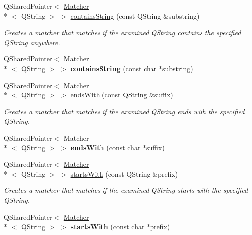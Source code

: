 \begin{DoxyCompactItemize}
\item 
Q\-Shared\-Pointer$<$ \hyperlink{class_hamcrest_qt_1_1_matcher}{Matcher}\\*
$<$ Q\-String $>$ $>$ \hyperlink{namespace_hamcrest_qt_ab456663a918a874b9fbf4c42dde6a439}{contains\-String} (const Q\-String \&substring)
\begin{DoxyCompactList}\small\item\em Creates a matcher that matches if the examined {\ttfamily Q\-String} contains the specified {\ttfamily Q\-String} anywhere. \end{DoxyCompactList}\item 
\hypertarget{namespace_hamcrest_qt_a4c961b244474f08f32c3c6523241c158}{Q\-Shared\-Pointer$<$ \hyperlink{class_hamcrest_qt_1_1_matcher}{Matcher}\\*
$<$ Q\-String $>$ $>$ {\bfseries contains\-String} (const char $\ast$substring)}\label{namespace_hamcrest_qt_a4c961b244474f08f32c3c6523241c158}

\item 
Q\-Shared\-Pointer$<$ \hyperlink{class_hamcrest_qt_1_1_matcher}{Matcher}\\*
$<$ Q\-String $>$ $>$ \hyperlink{namespace_hamcrest_qt_ae6827e66bbc17e98ac7bfc8bc256a399}{ends\-With} (const Q\-String \&suffix)
\begin{DoxyCompactList}\small\item\em Creates a matcher that matches if the examined {\ttfamily Q\-String} ends with the specified {\ttfamily Q\-String}. \end{DoxyCompactList}\item 
\hypertarget{namespace_hamcrest_qt_a43903b6fc354f9d0ff065192278bb62e}{Q\-Shared\-Pointer$<$ \hyperlink{class_hamcrest_qt_1_1_matcher}{Matcher}\\*
$<$ Q\-String $>$ $>$ {\bfseries ends\-With} (const char $\ast$suffix)}\label{namespace_hamcrest_qt_a43903b6fc354f9d0ff065192278bb62e}

\item 
Q\-Shared\-Pointer$<$ \hyperlink{class_hamcrest_qt_1_1_matcher}{Matcher}\\*
$<$ Q\-String $>$ $>$ \hyperlink{namespace_hamcrest_qt_a64e4b2a75d225fcd62ada49698f8614a}{starts\-With} (const Q\-String \&prefix)
\begin{DoxyCompactList}\small\item\em Creates a matcher that matches if the examined {\ttfamily Q\-String} starts with the specified {\ttfamily Q\-String}. \end{DoxyCompactList}\item 
\hypertarget{namespace_hamcrest_qt_a8631f62f98d1de7d44558107f0daf1f6}{Q\-Shared\-Pointer$<$ \hyperlink{class_hamcrest_qt_1_1_matcher}{Matcher}\\*
$<$ Q\-String $>$ $>$ {\bfseries starts\-With} (const char $\ast$prefix)}\label{namespace_hamcrest_qt_a8631f62f98d1de7d44558107f0daf1f6}

\end{DoxyCompactItemize}


